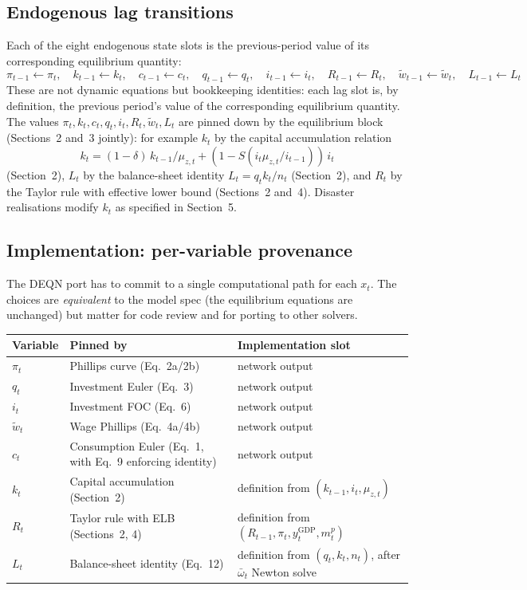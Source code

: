 \documentclass[11pt]{article}
\begin{document}
\subsection{Endogenous lag transitions}

Each of the eight endogenous state slots is the previous-period value of
its corresponding equilibrium quantity:
\begin{equation*}
  \pi_{t-1} \leftarrow \pi_t, \quad
  k_{t-1} \leftarrow k_t, \quad
  c_{t-1} \leftarrow c_t, \quad
  q_{t-1} \leftarrow q_t, \quad
  i_{t-1} \leftarrow i_t, \quad
  R_{t-1} \leftarrow R_t, \quad
  \tilde{w}_{t-1} \leftarrow \tilde{w}_t, \quad
  L_{t-1} \leftarrow L_t
\end{equation*}
These are not dynamic equations but bookkeeping identities: each lag slot
is, by definition, the previous period's value of the corresponding
equilibrium quantity. The values $\pi_t, k_t, c_t, q_t, i_t, R_t,
\tilde{w}_t, L_t$ are pinned down by the equilibrium block (Sections~2
and~3 jointly): for example $k_t$ by the capital accumulation relation
\[
  k_t = (1-\delta)\,k_{t-1}/\mu_{z,t} + (1 - S(i_t\mu_{z,t}/i_{t-1}))\,i_t
\]
(Section~2), $L_t$ by the balance-sheet identity $L_t = q_t k_t / n_t$
(Section~2), and $R_t$ by the Taylor rule with effective lower bound
(Sections~2 and~4). Disaster realisations modify $k_t$ as specified in
Section~5.

\subsection{Implementation: per-variable provenance}

The DEQN port has to commit to a single computational path for each
$x_t$. The choices are \emph{equivalent} to the model spec (the
equilibrium equations are unchanged) but matter for code review and for
porting to other solvers.

\begin{center}
\begin{tabular}{lll}
\toprule
Variable & Pinned by & Implementation slot \\
\midrule
$\pi_t$         & Phillips curve (Eq.~2a/2b) & network output \\
$q_t$           & Investment Euler (Eq.~3) & network output \\
$i_t$           & Investment FOC (Eq.~6) & network output \\
$\tilde{w}_t$   & Wage Phillips (Eq.~4a/4b) & network output \\
$c_t$           & Consumption Euler (Eq.~1, with Eq.~9 enforcing identity) & network output \\
$k_t$           & Capital accumulation (Section~2) & definition from $(k_{t-1}, i_t, \mu_{z,t})$ \\
$R_t$           & Taylor rule with ELB (Sections~2, 4) & definition from $(R_{t-1}, \pi_t, y_t^{\text{GDP}}, m_t^p)$ \\
$L_t$           & Balance-sheet identity (Eq.~12) & definition from $(q_t, k_t, n_t)$, after $\bar\omega_t$ Newton solve \\
\bottomrule
\end{tabular}
\end{center}
\end{document}

